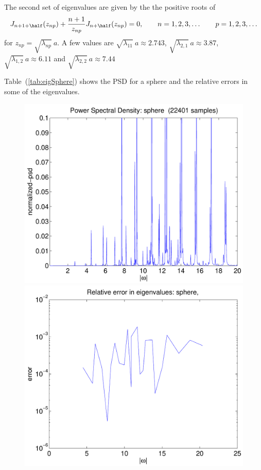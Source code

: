 The second set of eigenvalues are given by the the positive roots of 
\begin{align*}
  J_{n+1+\half}(z_{np})
     + {n+1\over z_{np}}J_{n+\half}(z_{np})=0 , 
                \qquad n=1,2,3,\ldots \qquad p=1,2,3,\ldots
\end{align*}
for $z_{np}=\sqrt{\lambda_{np}}~ a$. 
A few values are $\sqrt{\lambda_{11}}~ a \approx 2.743$, $\sqrt{\lambda_{2,1}}~ a \approx 3.87$,
$\sqrt{\lambda_{1,2}}~ a \approx 6.11$ and $\sqrt{\lambda_{2,2}}~ a \approx 7.44$

Table~(\ref{tab:eigSphere}) shows the PSD for a sphere and the relative errors in 
some of the eigenvalues.

\renewcommand{\figWidth}{.475\linewidth}
\begin{figure}
\begin{center}
\includegraphics[width=\figWidth]{figures/psd-bis2e-4-T200}
\includegraphics[width=\figWidth]{figures/eigenValues-relErr-bis2e-4-T200}

\end{center}
\end{figure}
